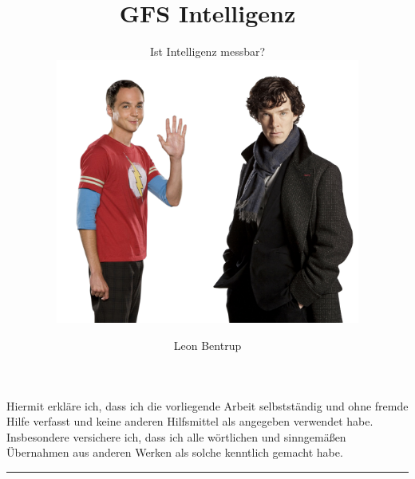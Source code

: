 \documentclass[12pt, a4paper]{scrreprt}
\title{GFS Intelligenz}
\subtitle{Ist Intelligenz messbar? \\ \vspace{1cm} \includegraphics[width=10cm]{img/intelligence.png} \vspace{0.7cm} }
\author{Leon Bentrup}
\begin{document}
  \maketitle
  \tableofcontents

  
  
  
  
  
  

  
  

  \newpage

  Hiermit erkläre ich, dass ich die vorliegende Arbeit selbstständig und ohne fremde Hilfe
  verfasst und keine anderen Hilfsmittel als angegeben verwendet habe. Insbesondere
  versichere ich, dass ich alle wörtlichen und sinngemäßen Übernahmen aus anderen Werken
  als solche kenntlich gemacht habe.
  \vspace{3cm}
  \hrule
\end{document}
